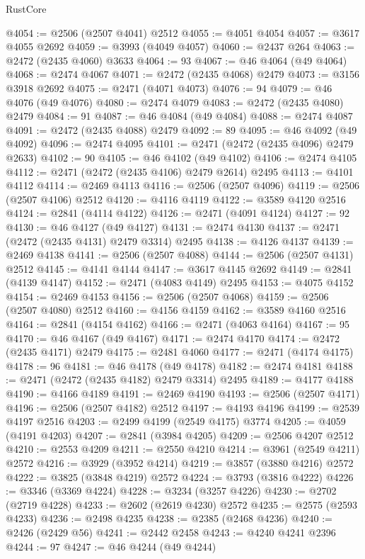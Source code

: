 \begin{lexlean}{RustCore}
\begin{coremodule}
@4054 := @2506 (@2507 @4041) @2512
@4055 := @4051 @4054
@4057 := @3617 @4055 @2692
@4059 := @3993 (@4049 @4057)
@4060 := @2437 @264
@4063 := @2472 (@2435 @4060) @3633
@4064 := 93
@4067 := @46 @4064 (@49 @4064)
@4068 := @2474 @4067
@4071 := @2472 (@2435 @4068) @2479
@4073 := @3156 @3918 @2692
@4075 := @2471 (@4071 @4073)
@4076 := 94
@4079 := @46 @4076 (@49 @4076)
@4080 := @2474 @4079
@4083 := @2472 (@2435 @4080) @2479
@4084 := 91
@4087 := @46 @4084 (@49 @4084)
@4088 := @2474 @4087
@4091 := @2472 (@2435 @4088) @2479
@4092 := 89
@4095 := @46 @4092 (@49 @4092)
@4096 := @2474 @4095
@4101 := @2471 (@2472 (@2435 @4096) @2479 @2633)
@4102 := 90
@4105 := @46 @4102 (@49 @4102)
@4106 := @2474 @4105
@4112 := @2471 (@2472 (@2435 @4106) @2479 @2614) @2495
@4113 := @4101 @4112
@4114 := @2469 @4113
@4116 := @2506 (@2507 @4096)
@4119 := @2506 (@2507 @4106) @2512
@4120 := @4116 @4119
@4122 := @3589 @4120 @2516
@4124 := @2841 (@4114 @4122)
@4126 := @2471 (@4091 @4124)
@4127 := 92
@4130 := @46 @4127 (@49 @4127)
@4131 := @2474 @4130
@4137 := @2471 (@2472 (@2435 @4131) @2479 @3314) @2495
@4138 := @4126 @4137
@4139 := @2469 @4138
@4141 := @2506 (@2507 @4088)
@4144 := @2506 (@2507 @4131) @2512
@4145 := @4141 @4144
@4147 := @3617 @4145 @2692
@4149 := @2841 (@4139 @4147)
@4152 := @2471 (@4083 @4149) @2495
@4153 := @4075 @4152
@4154 := @2469 @4153
@4156 := @2506 (@2507 @4068)
@4159 := @2506 (@2507 @4080) @2512
@4160 := @4156 @4159
@4162 := @3589 @4160 @2516
@4164 := @2841 (@4154 @4162)
@4166 := @2471 (@4063 @4164)
@4167 := 95
@4170 := @46 @4167 (@49 @4167)
@4171 := @2474 @4170
@4174 := @2472 (@2435 @4171) @2479
@4175 := @2481 @4060
@4177 := @2471 (@4174 @4175)
@4178 := 96
@4181 := @46 @4178 (@49 @4178)
@4182 := @2474 @4181
@4188 := @2471 (@2472 (@2435 @4182) @2479 @3314) @2495
@4189 := @4177 @4188
@4190 := @4166 @4189
@4191 := @2469 @4190
@4193 := @2506 (@2507 @4171)
@4196 := @2506 (@2507 @4182) @2512
@4197 := @4193 @4196
@4199 := @2539 @4197 @2516
@4203 := @2499 @4199 (@2549 @4175) @3774
@4205 := @4059 (@4191 @4203)
@4207 := @2841 (@3984 @4205)
@4209 := @2506 @4207 @2512
@4210 := @2553 @4209
@4211 := @2550 @4210
@4214 := @3961 (@2549 @4211) @2572
@4216 := @3929 (@3952 @4214)
@4219 := @3857 (@3880 @4216) @2572
@4222 := @3825 (@3848 @4219) @2572
@4224 := @3793 (@3816 @4222)
@4226 := @3346 (@3369 @4224)
@4228 := @3234 (@3257 @4226)
@4230 := @2702 (@2719 @4228)
@4233 := @2602 (@2619 @4230) @2572
@4235 := @2575 (@2593 @4233)
@4236 := @2498 @4235
@4238 := @2385 (@2468 @4236)
@4240 := @2426 (@2429 @56)
@4241 := @2442 @2458
@4243 := @4240 @4241 @2396
@4244 := 97
@4247 := @46 @4244 (@49 @4244)

\end{coremodule}
\end{lexlean}
